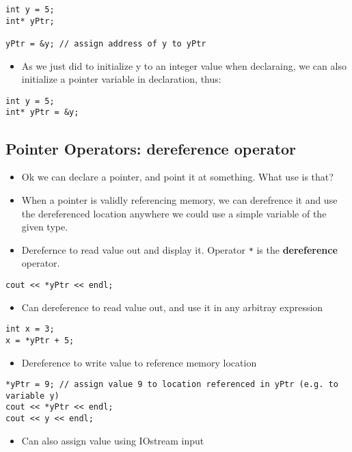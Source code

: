 \documentclass[11pt]{article}
\begin{document}
\begin{verbatim}
int y = 5;
int* yPtr;

yPtr = &y; // assign address of y to yPtr
\end{verbatim}
\begin{itemize}
\item As we just did to initialize y to an integer value when declaraing, we can also initialize
  a pointer variable in declaration, thus:
\end{itemize}

\begin{verbatim}
int y = 5;
int* yPtr = &y;
\end{verbatim}
\subsection{Pointer Operators: dereference operator}
\label{sec-2-2}

\begin{itemize}
\item Ok we can declare a pointer, and point it at something.  What use is that?
\item When a pointer is validly referencing memory, we can derefrence it
  and use the dereferenced location anywhere we could use a simple variable
  of the given type.
\item Derefernce to read value out and display it.  Operator \verb~*~ is the \textbf{dereference} operator.
\end{itemize}

\begin{verbatim}
cout << *yPtr << endl;
\end{verbatim}
\begin{itemize}
\item Can dereference to read value out, and use it in any arbitray expression
\end{itemize}

\begin{verbatim}
int x = 3;
x = *yPtr + 5;
\end{verbatim}
\begin{itemize}
\item Dereference to write value to reference memory location
\end{itemize}

\begin{verbatim}
*yPtr = 9; // assign value 9 to location referenced in yPtr (e.g. to variable y)
cout << *yPtr << endl;
cout << y << endl;
\end{verbatim}
\begin{itemize}
\item Can also assign value using IOstream input
\end{itemize}
\end{document}

